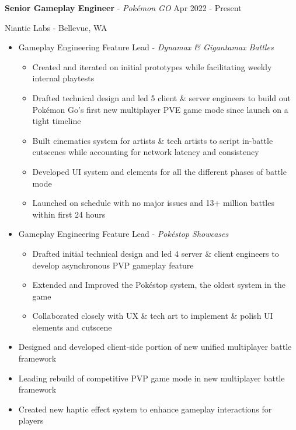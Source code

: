 \documentclass[resmargin,10pt]{res} %
\begin{document}
\begin{resume}
    {\bf Senior Gameplay Engineer} - \textit{Pokémon GO} \hfill Apr 2022 - Present
    \begin{ncolumn}{1}
        {Niantic Labs} - Bellevue, WA \\
    \end{ncolumn}
    \begin{itemize}
        \setlength\itemsep{-0.1em}
        \item Gameplay Engineering Feature Lead - \textit{Dynamax \& Gigantamax Battles}
        \begin{itemize}[leftmargin=0.5em,topsep=0.0em]
            \setlength\itemsep{-0.0em}
            \item Created and iterated on initial prototypes while facilitating weekly internal playtests
            \item Drafted technical design and led 5 client \& server engineers to build out Pokémon Go's first new multiplayer PVE game mode since launch on a tight timeline
            \item Built cinematics system for artists \& tech artists to script in-battle cutscenes while accounting for network latency and consistency
            \item Developed UI system and elements for all the different phases of battle mode
            \item Launched on schedule with no major issues and 13+ million battles within first 24 hours
        \end{itemize}
        \item Gameplay Engineering Feature Lead - \textit{Pokéstop Showcases}
        \begin{itemize}[leftmargin=0.5em,topsep=0.0em]
            \setlength\itemsep{-0.0em}
            \item Drafted initial technical design and led 4 server \& client engineers to develop asynchronous PVP gameplay feature
            \item Extended and Improved the Pokéstop system, the oldest system in the game
            \item Collaborated closely with UX \& tech art to implement \& polish UI elements and cutscene
        \end{itemize}
        \item Designed and developed client-side portion of new unified multiplayer battle framework
        \item Leading rebuild of competitive PVP game mode in new multiplayer battle framework
        \item Created new haptic effect system to enhance gameplay interactions for players

\end{itemize}
\end{resume}
\end{document}
